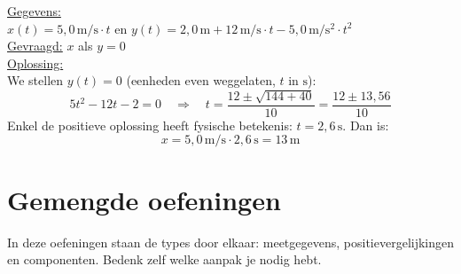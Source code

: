 \documentclass{ximera}
\begin{document}
\begin{exercise}
\begin{question}
        \begin{solution}\nl
            \underline{Gegevens:}\\
            $x(t) = 5{,}0 \, \mathrm{m/s} \cdot t$ en $y(t) = 2{,}0 \, \mathrm{m} + 12 \, \mathrm{m/s} \cdot t - 5{,}0 \, \mathrm{m/s^2} \cdot t^{2}$\\

            \underline{Gevraagd:} $x$ als $y = 0$\\

            \underline{Oplossing:}\\
            We stellen $y(t) = 0$ (eenheden even weggelaten, $t$ in $\mathrm{s}$):
            \[
                5t^{2} - 12t - 2 = 0 \quad \Rightarrow \quad t = \frac{12 \pm \sqrt{144 + 40}}{10} = \frac{12 \pm 13{,}56}{10}
            \]
            Enkel de positieve oplossing heeft fysische betekenis: $t = 2{,}6 \, \mathrm{s}$. Dan is:
            \[
                x = 5{,}0 \, \mathrm{m/s} \cdot 2{,}6 \, \mathrm{s} = \boxed{13 \, \mathrm{m}}
            \]
        \end{solution}
    \end{question}
\end{exercise}
\section{Gemengde oefeningen}
In deze oefeningen staan de types door elkaar: meetgegevens, positievergelijkingen en componenten. Bedenk zelf welke aanpak je nodig hebt.
\end{document}
